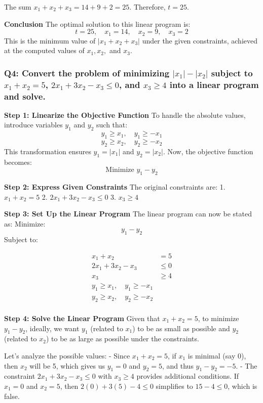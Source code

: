 \documentclass[8pt]{article}
\begin{document}
{The sum \( x_1 + x_2 + x_3 = 14 + 9 + 2 = 25 \). Therefore, \( t = 25 \).

\textbf{Conclusion}
The optimal solution to this linear program is:
\[
t = 25, \quad x_1 = 14, \quad x_2 = 9, \quad x_3 = 2
\]
This is the minimum value of \( |x_1 + x_2 + x_3| \) under the given constraints, achieved at the computed values of \( x_1, x_2, \) and \( x_3 \).

\subsubsection*{Q4: Convert the problem of minimizing \(|x_1| - |x_2|\) subject to \(x_1 + x_2 = 5\), \(2x_1 + 3x_2 - x_3 \leq 0\), and \(x_3 \geq 4\) into a linear program and solve.}

\textbf{Step 1: Linearize the Objective Function}
To handle the absolute values, introduce variables \( y_1 \) and \( y_2 \) such that:
\[
y_1 \geq x_1, \quad y_1 \geq -x_1
\]
\[
y_2 \geq x_2, \quad y_2 \geq -x_2
\]
This transformation ensures \( y_1 = |x_1| \) and \( y_2 = |x_2| \). Now, the objective function becomes:
\[
\text{Minimize } y_1 - y_2
\]

\textbf{Step 2: Express Given Constraints}
The original constraints are:
1. \( x_1 + x_2 = 5 \)
2. \( 2x_1 + 3x_2 - x_3 \leq 0 \)
3. \( x_3 \geq 4 \)

\textbf{Step 3: Set Up the Linear Program}
The linear program can now be stated as:
Minimize:
\[
y_1 - y_2
\]
Subject to:

\begin{align*}
x_1 + x_2 &= 5 \\
2x_1 + 3x_2 - x_3 &\leq 0 \\
x_3 &\geq 4 \\
y_1 \geq x_1, \quad y_1 \geq -x_1 \\
y_2 \geq x_2, \quad y_2 \geq -x_2 \\
\end{align*}

\textbf{Step 4: Solve the Linear Program}
Given that \( x_1 + x_2 = 5 \), to minimize \( y_1 - y_2 \), ideally, we want \( y_1 \) (related to \( x_1 \)) to be as small as possible and \( y_2 \) (related to \( x_2 \)) to be as large as possible under the constraints.

Let's analyze the possible values:
- Since \( x_1 + x_2 = 5 \), if \( x_1 \) is minimal (say 0), then \( x_2 \) will be 5, which gives us \( y_1 = 0 \) and \( y_2 = 5 \), and thus \( y_1 - y_2 = -5 \).
- The constraint \( 2x_1 + 3x_2 - x_3 \leq 0 \) with \( x_3 \geq 4 \) provides additional conditions. If \( x_1 = 0 \) and \( x_2 = 5 \), then \( 2(0) + 3(5) - 4 \leq 0 \) simplifies to \( 15 - 4 \leq 0 \), which is false.

}
\end{document}
